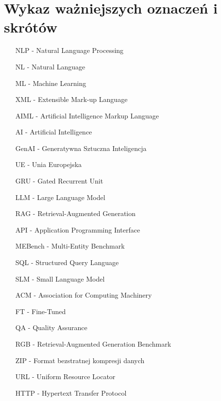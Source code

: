\chapter*{Wykaz ważniejszych oznaczeń i skrótów}


\begin{itemize}
[noitemsep,topsep=0pt,parsep=0pt,partopsep=0pt,labelwidth=1cm,align=left,itemindent=0pt]

    \item[NLP] - Natural Language Processing
    \item[NL] - Natural Language
    \item[ML] - Machine Learning
    \item[XML] - Extensible Mark-up Language
    \item[AIML] - Artificial Intelligence Markup Language
    \item[AI] - Artificial Intelligence
    \item[GenAI] - Generatywna Sztuczna Inteligencja 
    \item[UE] - Unia Europejska
    \item[GRU] - Gated Recurrent Unit
    \item[LLM] - Large Language Model
    \item[RAG] - Retrieval-Augmented Generation
    \item[API] - Application Programming Interface
    \item[MEBench] - Multi-Entity Benchmark
    \item[SQL] - Structured Query Language
    \item[SLM] - Small Language Model
    \item[ACM] - Association for Computing Machinery
    \item[FT] - Fine-Tuned
    \item[QA] - Quality Assurance
    \item[RGB] - Retrieval-Augmented Generation Benchmark 
    \item[ZIP] - Format bezstratnej kompresji danych
    \item[URL] - Uniform Resource Locator
    \item[HTTP] - Hypertext Transfer Protocol
    
\end{itemize}
